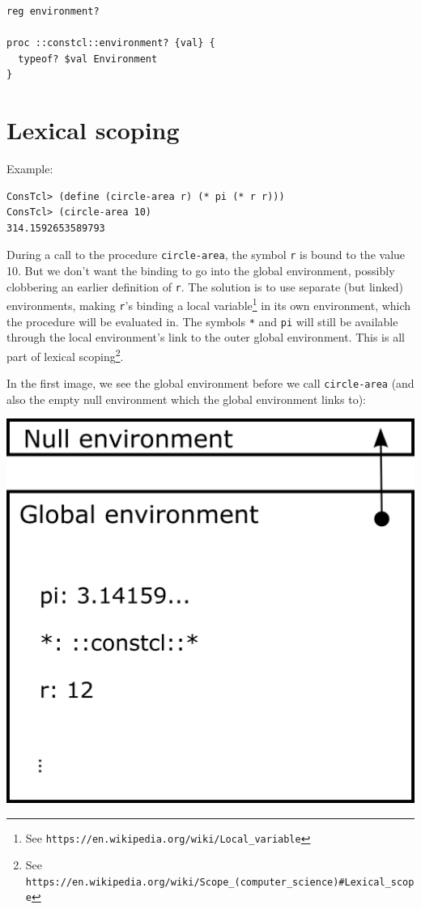 \documentclass[a5paper,draft]{memoir}
\begin{document}
\begin{lstlisting}
reg environment?

proc ::constcl::environment? {val} {
  typeof? $val Environment
}
\end{lstlisting}

\section{Lexical scoping}
\label{lexical-scoping}

Example:

\begin{verbatim}
ConsTcl> (define (circle-area r) (* pi (* r r)))
ConsTcl> (circle-area 10)
314.1592653589793
\end{verbatim}

During a call to the procedure \texttt{circle-area}, the symbol \texttt{r} is bound to the value 10. But we don't want the binding to go into the global environment, possibly clobbering an earlier definition of \texttt{r}. The solution is to use separate (but linked) environments, making \texttt{r}'s binding a local variable\footnote{See \texttt{https://en.wikipedia.org/wiki/Local\_variable}} in its own environment, which the procedure will be evaluated in. The symbols \texttt{*} and \texttt{pi} will still be available through the local environment's link to the outer global environment. This is all part of lexical scoping\footnote{See \texttt{https://en.wikipedia.org/wiki/Scope\_(computer\_science)\#Lexical\_scope}}.

In the first image, we see the global environment before we call \texttt{circle-area} (and also the empty null environment which the global environment links to):

\includegraphics{images/env1.png}
\end{document}
